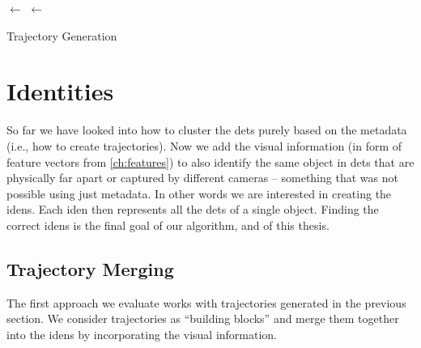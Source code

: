 \begin{algorithm}

 
 \BlankLine
 \Traj $\leftarrow$ \UnionFind{ }\;
 \Win $\leftarrow$ \Queue{ }\;
 \Return \Traj

 \caption{Trajectory Generation}
 \label{alg:trajectory_generation}
\end{algorithm}

\section{Identities}

\label{sec:generating_identities}

So far we have looked into how to cluster the \glspl{det} purely based on the metadata (i.e., how to create trajectories). Now we add the visual information (in form of feature vectors from \autoref{ch:features}) to also identify the same object in \glspl{det} that are physically far apart or captured by different cameras -- something that was not possible using just metadata. In other words we are interested in creating the \glspl{iden}. Each \gls{iden} then represents all the \glspl{det} of a single object. Finding the correct \glspl{iden} is the final goal of our algorithm, and of this thesis.

\subsection{Trajectory Merging}

The first approach we evaluate works with trajectories generated in the previous section. We consider trajectories as ``building blocks'' and merge them together into the \glspl{iden} by incorporating the visual information.

